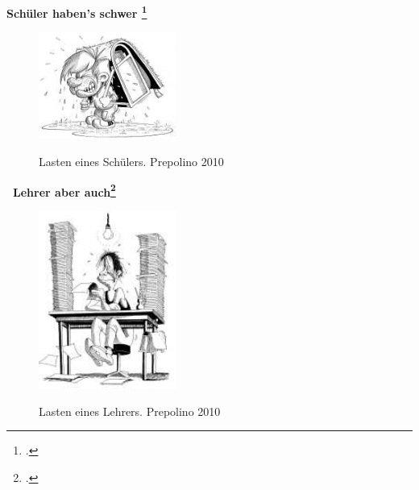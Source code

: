 
\begin{center}
	\textbf{Schüler haben's schwer \punkte\footcite{prepolino2010}}
\end{center}

\begin{figure}[h]
	\centering
		\includegraphics[width=0.4\textwidth]{images/Lasten-eines-Schuelers.jpg}\\
	\caption{Lasten eines Schülers. Prepolino 2010}
	\label{fig:Lasten-eines-Schuelers}
\end{figure}

\begin{center}
	\textbf{\punkte\ Lehrer aber auch\footcite{prepolino2010}}
\end{center}

\begin{figure}[h]
	\centering
		\includegraphics[width=0.4\textwidth]{images/Lasten-eines-Lehrers.jpg}\\
	\caption{Lasten eines Lehrers. Prepolino 2010}
	\label{fig:Lasten-eines-Lehrers}
\end{figure}





